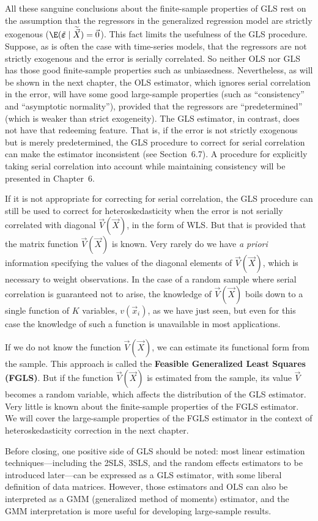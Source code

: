 All these sanguine conclusions about the finite-sample properties of GLS rest on the
assumption that the regressors in the generalized regression model are strictly
exogenous ($\E(\tilde{\bm{\varepsilon}} \mid \widetilde{\vec{X}}) = \vec{0}$).  This
fact limits the usefulness of the GLS procedure.  Suppose, as is often the case with
time-series models, that the regressors are not strictly exogenous and the error is
serially correlated.  So neither OLS nor GLS has those good finite-sample properties
such as unbiasedness.  Nevertheless, as will be shown in the next chapter, the OLS
estimator, which ignores serial correlation in the error, will have some good
large-sample properties (such as ``consistency'' and ``asymptotic normality''),
provided that the regressors are ``predetermined'' (which is weaker than strict
exogeneity).  The GLS estimator, in contrast, does not have that redeeming feature.
That is, if the error is not strictly exogenous but is merely predetermined, the GLS
procedure to correct for serial correlation can make the estimator inconsistent (see
Section~6.7).  A procedure for explicitly taking serial correlation into account while
maintaining consistency will be presented in Chapter~6.

If it is not appropriate for correcting for serial correlation, the GLS procedure can
still be used to correct for heteroskedasticity when the error is not serially
correlated with diagonal $\vec{V}(\vec{X})$, in the form of WLS\@.  But that is
provided that the matrix function $\vec{V}(\vec{X})$ is known.  Very rarely do we have
\emph{a priori} information specifying the values of the diagonal elements of
$\vec{V}(\vec{X})$, which is necessary to weight observations.  In the case of a
random sample where serial correlation is guaranteed not to arise, the knowledge of
$\vec{V}(\vec{X})$ boils down to a single function of $K$ variables, $v(\vec{x}_i)$,
as we have just seen, but even for this case the knowledge of such a function is
unavailable in most applications.

If we do not know the function $\vec{V}(\vec{X})$, we can estimate its functional form
from the sample.  This approach is called the \textbf{Feasible Generalized Least Squares
(FGLS)}.  But if the function $\vec{V}(\vec{X})$ is estimated from the sample, its
value $\vec{V}$ becomes a random variable, which affects the distribution of the GLS
estimator.  Very little is known about the finite-sample properties of the FGLS
estimator.  We will cover the large-sample properties of the FGLS estimator in the
context of heteroskedasticity correction in the next chapter.

Before closing, one positive side of GLS should be noted: most linear estimation
techniques---including the 2SLS, 3SLS, and the random effects estimators to be
introduced later---can be expressed as a GLS estimator, with some liberal definition
of data matrices.  However, those estimators and OLS can also be interpreted as a GMM
(generalized method of moments) estimator, and the GMM interpretation is more useful
for developing large-sample results.
